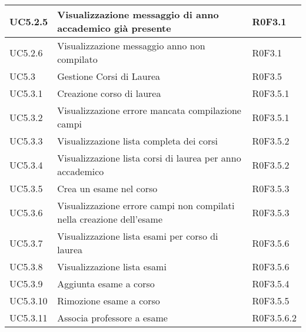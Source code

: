 \documentclass[AnalisiDeiRequisiti.tex]{subfiles}
\begin{document}
\begin{longtable}[H]{|p{2cm}|p{5cm}|p{5cm}|}
	UC5.2.5 & Visualizzazione messaggio di anno accademico già presente & R0F3.1 \\ \hline
	UC5.2.6 & Visualizzazione messaggio anno non compilato &  R0F3.1 \\ \hline
	UC5.3 & Gestione Corsi di Laurea &  R0F3.5 \\  \hline
	UC5.3.1 & Creazione corso di laurea &  R0F3.5.1 \\ \hline
	UC5.3.2 & Visualizzazione errore mancata compilazione campi & R0F3.5.1 \\ \hline
	UC5.3.3 & Visualizzazione lista completa dei corsi &  R0F3.5.2 \\ \hline
	UC5.3.4 & Visualizzazione lista corsi di laurea per anno accademico & R0F3.5.2  \\ \hline
	UC5.3.5 & Crea un esame nel corso &  R0F3.5.3\\ \hline
	UC5.3.6 & Visualizzazione errore campi non compilati nella creazione dell'esame & R0F3.5.3  \\ \hline
	UC5.3.7 & Visualizzazione lista esami per corso di laurea & R0F3.5.6 \\ \hline
	UC5.3.8 & Visualizzazione lista esami &  R0F3.5.6 \\ \hline
	UC5.3.9 & Aggiunta esame a corso &  R0F3.5.4 \\ \hline
	UC5.3.10 & Rimozione esame a corso &  R0F3.5.5 \\ \hline
	UC5.3.11 & Associa professore a esame & R0F3.5.6.2 \\ \hline
	

\end{longtable}
\end{document}

